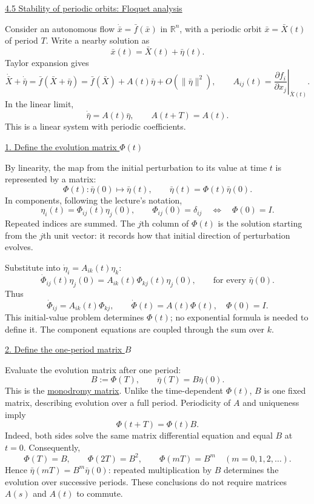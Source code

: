 \documentclass[11pt,a4paper]{article}
\begin{document}
\newpage
\noindent\underline{4.5 Stability of periodic orbits: Floquet analysis}

\medskip
\noindent Consider an autonomous flow $\dot{\bar x}=\bar f(\bar x)$ in
$\mathbb R^n$, with a periodic orbit $\bar x=\bar X(t)$ of period $T$.
Write a nearby solution as
\[
\bar x(t)=\bar X(t)+\bar\eta(t).
\]
Taylor expansion gives
\[
\dot{\bar X}+\dot{\bar\eta}
=\bar f(\bar X+\bar\eta)
=\bar f(\bar X)+A(t)\bar\eta+O(\|\bar\eta\|^2),
\qquad
A_{ij}(t)=\left.\frac{\partial f_i}{\partial x_j}\right|_{\bar X(t)}.
\]
In the linear limit,
\[
\dot{\bar\eta}=A(t)\bar\eta,\qquad A(t+T)=A(t).
\]
This is a linear system with periodic coefficients.

\medskip
\noindent\underline{1. Define the evolution matrix $\Phi(t)$}

\medskip
\noindent By linearity, the map from the initial perturbation to its value
at time $t$ is represented by a matrix:
\[
\Phi(t):\bar\eta(0)\longmapsto\bar\eta(t),\qquad
\boxed{\bar\eta(t)=\Phi(t)\bar\eta(0)}.
\]
In components, following the lecture's notation,
\[
\eta_i(t)=\Phi_{ij}(t)\eta_j(0),\qquad
\Phi_{ij}(0)=\delta_{ij}\quad\Longleftrightarrow\quad\Phi(0)=I.
\]
Repeated indices are summed. The $j$th column of $\Phi(t)$ is the solution
starting from the $j$th unit vector: it records how that initial direction
of perturbation evolves.

Substitute into $\dot\eta_i=A_{ik}(t)\eta_k$:
\[
\dot\Phi_{ij}(t)\eta_j(0)
=A_{ik}(t)\Phi_{kj}(t)\eta_j(0),
\qquad\text{for every }\bar\eta(0).
\]
Thus
\[
\dot\Phi_{ij}=A_{ik}(t)\Phi_{kj},\qquad
\boxed{\dot\Phi(t)=A(t)\Phi(t),\quad\Phi(0)=I}.
\]
This initial-value problem determines $\Phi(t)$; no exponential formula
is needed to define it. The component equations are coupled through the
sum over $k$.

\medskip
\noindent\underline{2. Define the one-period matrix $B$}

\medskip
\noindent Evaluate the evolution matrix after one period:
\[
\boxed{B:=\Phi(T)},\qquad \bar\eta(T)=B\bar\eta(0).
\]
This is the \underline{monodromy matrix}. Unlike the time-dependent
$\Phi(t)$, $B$ is one fixed matrix, describing evolution over a full period.
Periodicity of $A$ and uniqueness imply
\[
\Phi(t+T)=\Phi(t)B.
\]
Indeed, both sides solve the same matrix differential equation and equal
$B$ at $t=0$. Consequently,
\[
\Phi(T)=B,\qquad \Phi(2T)=B^2,\qquad
\boxed{\Phi(mT)=B^m\quad(m=0,1,2,\ldots)}.
\]
Hence $\bar\eta(mT)=B^m\bar\eta(0)$: repeated multiplication by $B$
determines the evolution over successive periods. These conclusions do
not require matrices $A(s)$ and $A(t)$ to commute.
\end{document}
